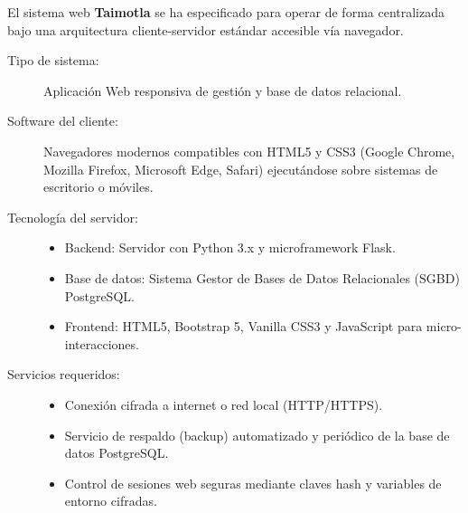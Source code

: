 El sistema web \textbf{Taimotla} se ha especificado para operar de forma centralizada bajo una arquitectura cliente-servidor estándar accesible vía navegador.

\begin{description}
	\item[Tipo de sistema:] Aplicación Web responsiva de gestión y base de datos relacional.
	\item[Software del cliente:] Navegadores modernos compatibles con HTML5 y CSS3 (Google Chrome, Mozilla Firefox, Microsoft Edge, Safari) ejecutándose sobre sistemas de escritorio o móviles.
	\item[Tecnología del servidor:] 
		\begin{itemize}
			\item Backend: Servidor con Python 3.x y microframework Flask.
			\item Base de datos: Sistema Gestor de Bases de Datos Relacionales (SGBD) PostgreSQL.
			\item Frontend: HTML5, Bootstrap 5, Vanilla CSS3 y JavaScript para micro-interacciones.
		\end{itemize}
	\item[Servicios requeridos:]
		\begin{itemize}
			\item Conexión cifrada a internet o red local (HTTP/HTTPS).
			\item Servicio de respaldo (backup) automatizado y periódico de la base de datos PostgreSQL.
			\item Control de sesiones web seguras mediante claves hash y variables de entorno cifradas.
		\end{itemize}
\end{description}
